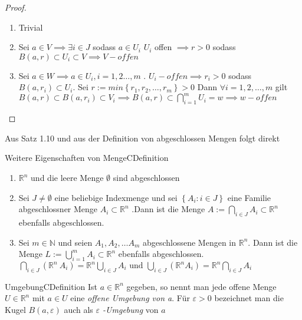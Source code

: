 \documentclass[11.5 pt, a4paper]{memoir}
\begin{document}
 \begin{proof}
     \begin{enumerate}[label=\alph*)]
         \item Trivial
         \item Sei $ a \in V \implies \exists i \in J$ sodass $ a \in U_i$
            $ U_{i} $ offen $ \implies r>0 $ sodass $ B(a,r) \subset U_{i}
            \subset V \implies V-offen$ 
         \item Sei $ a \in W \implies a \in U_{i}, i = 1,2 \dots , m $ . $ 
             U_{i}-offen \implies r_{i}>0  $ sodass $ B(a,r_i) \subset U_{i}
            $. Sei $ r:= min\left\{ r_1,r_2,\dots, r_{m} \right\} > 0 $  
            Dann $ \forall i = 1,2, \dots , m $ gilt $ B(a,r) \subset 
            B(a,r_i) \subset V_{i} \implies B(a,r) \subset 
            \bigcap\limits_{i=1}^{m} U_{i} = w \implies w-offen  $ 
     \end{enumerate}
 \end{proof}
 Aus Satz 1.10 und aus der Definition von abgeschlossen Mengen folgt direkt
 \begin{ibox}{Weitere Eigenschaften von Menge}{CDefinition}
     \begin{enumerate}[label=\alph*)]
         \item $ \mathbb{R}^n $ und die leere Menge $ \emptyset $ sind 
             abgeschlossen
         \item Sei $ J \neq \emptyset $ eine beliebige Indexmenge und sei 
             $ \left\{ A_{i} : i \in J \right\}  $ eine Familie
             abgeschlossner Menge $ A_{i} \subset \mathbb{R}^n $ .Dann ist
             die Menge $ A := \bigcap\limits_{i \in J}^{} A_{i} \subset 
             \mathbb{R}^n$ ebenfalls abgeschlossen.
         \item Sei $ m \in \mathbb{N}  $ und seien $ A_1, A_2, \dots A_{m}$
             abgeschlossene Mengen in $ \mathbb{R}^n $. Dann ist die Menge 
             $ L:= \bigcup\limits_{i=1}^{m} A_{i} \subset \mathbb{R}^n  $ 
             ebenfalls abgeschlossen. $ \bigcap\limits_{i \in J }^{}  \left( \mathbb{R}^n \ A_{i} \right) = \mathbb{R}^n
             \bigcup\limits_{i \in J}^{} A_{i} \text{ und } \bigcup\limits_{i \in J}^{} \left( \mathbb{R}^n A_{i} \right) = \mathbb{R}^n
             \bigcap\limits_{i \in J}^{} A_{i} $ 
     \end{enumerate}
 \end{ibox}
 
\begin{ibox}{Umgebung}{CDefinition}
    Ist $ a \in \mathbb{R}^n $ gegeben, so nennt man jede offene Menge $ U \in \mathbb{R}^n $ mit $ a \in U $ eine 
    \textit{offene Umgebung von a}. Für $ \varepsilon > 0 $ bezeichnet man die Kugel $ B(a,\varepsilon) $ 
    auch als \textit{ $\varepsilon$ -Umgebung }von $ a $ 
\end{ibox}
\end{document}
